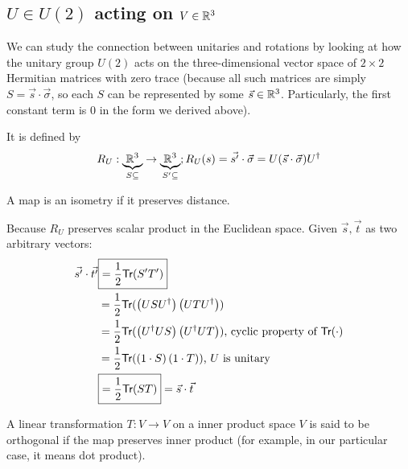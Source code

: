 \documentclass[12pt]{article}
\begin{document}
\subsection{$U\in U(2)$ acting on $V\in {\mathbb R}^3$}
\begin{remark}
We can study the connection between unitaries and rotations by looking at how the unitary group $U(2)$ acts on the three-dimensional vector space of $2\times 2$ Hermitian matrices with zero trace (because all such matrices are simply $S = \vec{s} \cdot \vec{\sigma}$, so each $S$ can be represented by some $\vec{s}\in {\mathbb R}^3$. Particularly, the first constant term is $0$ in the form we derived above).
\end{remark}

\begin{definition}\label{defn:R_U}
It is defined by $$
R_U: \underset{S\subseteq}{\underbrace{{\mathbb R}^3}}\rightarrow \underset{S'\subseteq}{\underbrace{{\mathbb R}^3}}; R_U(s) = \vec{s'}\cdot \vec{\sigma} = U(\vec{s}\cdot \vec{\sigma})U^\dag
$$    
\end{definition}

\begin{definition}[isometry]
A map is an isometry if it preserves distance.
\end{definition}

\begin{proposition}[$R_U$ is an isometry]\label{prop:R_U-isometry}
Because $R_U$ preserves scalar product in the Euclidean space. Given $\vec{s}, \vec{t}$ as two arbitrary vectors:$$
\begin{aligned}
\vec{s'}\cdot \vec{t'}
    &\boxed{= \frac{1}{2}\textsf{Tr}(S'T')}\\
    &= \frac{1}{2}\textsf{Tr}(\left(USU^\dag\right)\left(UTU^\dag\right))\\
    &= \frac{1}{2}\textsf{Tr}(\left(U^\dag US\right)\left(U^\dag UT\right))\text{, cyclic property of $\textsf{Tr}(\cdot)$}\\
    &= \frac{1}{2}\textsf{Tr}(\left(1\cdot S\right)\left(1\cdot T\right))\text{, $U$ is unitary}\\
    &\boxed{= \frac{1}{2}\textsf{Tr}(ST)} = \vec{s} \cdot \vec{t}
\end{aligned}
$$
\end{proposition}

\begin{definition}
A linear transformation $T:V\rightarrow V$ on a inner product space $V$ is said to be orthogonal if the map preserves inner product (for example, in our particular case, it means dot product).
\end{definition}
\end{document}
